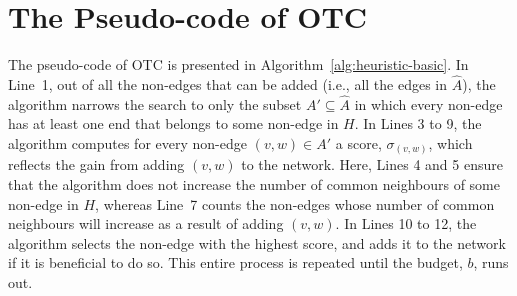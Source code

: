 \documentclass[twocolumn]{article}
\newcommand{\FA}{\widehat{A}}
\newcommand{\Hide}{H}
\begin{document}

\section{The Pseudo-code of OTC}\label{sec:OTC:pseudocode}
\noindent The pseudo-code of OTC is presented in Algorithm~\ref{alg:heuristic-basic}. In Line~1, out of all the non-edges that can be added (i.e., all the edges in $\FA$), the algorithm narrows the search to only the subset $A'\subseteq \FA$ in which every non-edge has at least one end that belongs to some non-edge in $\Hide$. In Lines 3 to 9, the algorithm computes for every non-edge $(v,w)\in A'$ a score, $\sigma_{(v,w)}$, which reflects the gain from adding $(v,w)$ to the network. Here, Lines 4 and 5 ensure that the algorithm does not increase the number of common neighbours of some non-edge in $\Hide$, whereas Line~7 counts the non-edges whose number of common neighbours will increase as a result of adding $(v,w)$. In Lines 10 to 12, the algorithm selects the non-edge with the highest score, and adds it to the network if it is beneficial to do so. This entire process is repeated until the budget, $b$, runs out.
\end{document}

